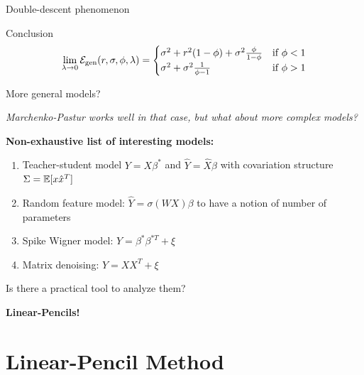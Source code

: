 \documentclass[10pt]{beamer}
\begin{document}
\begin{frame}{Double-descent phenomenon}
  \begin{alertblock}{Conclusion \cite{belkin2020two,Hastie-Montanari-2019}}
  \begin{equation*}
    \lim_{\lambda \to 0}\mathcal E_{\text{gen}}(r,\sigma,\phi,\lambda) = \begin{cases}
      \sigma^2 + r^2 (1-\phi) + \sigma^2 \frac{ \phi}{1 - \phi} & \text{if } \phi < 1   \\
      \sigma^2 + \sigma^2 \frac{1}{\phi - 1} & \text{if } \phi > 1
  \end{cases}
  \end{equation*}
  \end{alertblock}
\end{frame}




\begin{frame}{More general models?}

  \emph{Marchenko-Pastur works well in that case, but what about more complex models?}

  \textbf{Non-exhaustive list of interesting models:}

  \begin{enumerate}
    \item Teacher-student model $Y = X \beta^*$ and $\hat Y = \hat X \beta$ with covariation structure $\Sigma = \mathbb E[ x \hat x^T]$
    \item Random feature model: $\hat Y = \sigma(WX) \beta$ to have a notion of number of parameters
    \item Spike Wigner model: $Y = \beta^{*} \beta^{*T} + \xi$ 
    \item Matrix denoising: $Y = XX^T + \xi$
  \end{enumerate}

  \vspace*{0.3cm}

  \begin{block}{Is there a practical tool to analyze them?}
    \begin{center}
      \textbf{Linear-Pencils!}
    \end{center}
  \end{block}
\end{frame}

\section{Linear-Pencil Method}
\end{document}
